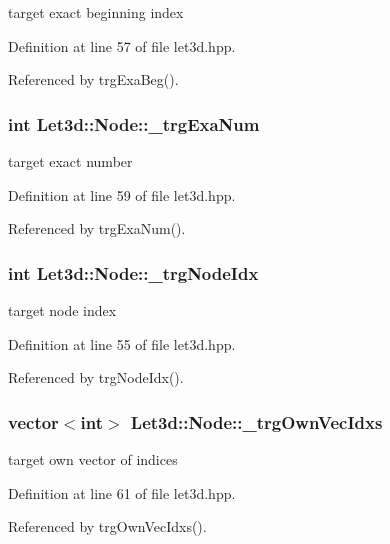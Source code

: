 target exact beginning index 

Definition at line 57 of file let3d.hpp.

Referenced by trg\-Exa\-Beg().
\subsubsection{\setlength{\rightskip}{0pt plus 5cm}int {\bf Let3d::Node::\_\-trg\-Exa\-Num}\hspace{0.3cm}{\tt  [protected]}}\label{classLet3d_1_1Node_2a6b5fcd93e247baee03394837e10be1_2a6b5fcd93e247baee03394837e10be1}


target exact number 

Definition at line 59 of file let3d.hpp.

Referenced by trg\-Exa\-Num().
\subsubsection{\setlength{\rightskip}{0pt plus 5cm}int {\bf Let3d::Node::\_\-trg\-Node\-Idx}\hspace{0.3cm}{\tt  [protected]}}\label{classLet3d_1_1Node_32f05a768bec93058dcd44a58c4f6c0c_32f05a768bec93058dcd44a58c4f6c0c}


target node index 

Definition at line 55 of file let3d.hpp.

Referenced by trg\-Node\-Idx().
\subsubsection{\setlength{\rightskip}{0pt plus 5cm}vector$<$int$>$ {\bf Let3d::Node::\_\-trg\-Own\-Vec\-Idxs}\hspace{0.3cm}{\tt  [protected]}}\label{classLet3d_1_1Node_b5da25d3b8896abf8b59f6aa1aa23867_b5da25d3b8896abf8b59f6aa1aa23867}


target own vector of indices 

Definition at line 61 of file let3d.hpp.

Referenced by trg\-Own\-Vec\-Idxs().
